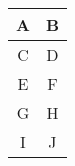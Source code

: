\documentclass{article}
\begin{document}
    \begin{tabular}{cc}
        A & B \\ 
        \hline
        C & D \\
        E & F \\
        G & H \\
        I & J \\
    \end{tabular}
\end{document}
